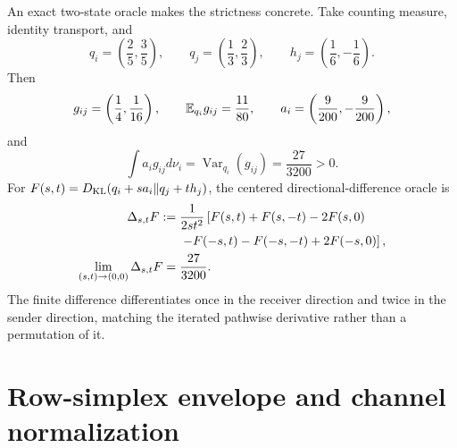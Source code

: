 An exact two-state oracle makes the strictness concrete. Take counting measure, identity transport, and
\begin{equation}
q_i=\left(\frac25,\frac35\right),
\qquad
q_j=\left(\frac13,\frac23\right),
\qquad
h_j=\left(\frac16,-\frac16\right).
\label{eq:appendix-moving-peer-discrete-data}
\end{equation}
Then
\begin{equation}
g_{ij}=\left(\frac14,\frac1{16}\right),
\qquad
\mathbb E_{q_i}g_{ij}=\frac{11}{80},
\qquad
a_i=\left(\frac9{200},-\frac9{200}\right),
\label{eq:appendix-moving-peer-discrete-tangent}
\end{equation}
and
\begin{equation}
\int a_i g_{ij}d\nu_i
=\operatorname{Var}_{q_i}(g_{ij})
=\frac{27}{3200}>0.
\label{eq:appendix-moving-peer-discrete-variance}
\end{equation}
For \(F(s,t)=D_{\mathrm{KL}}(q_i+s a_i\Vert q_j+t h_j)\), the centered directional-difference oracle is
\begin{align}
\Delta_{s,t}F
:={}&\frac{1}{2st^2}\left[
F(s,t)+F(s,-t)-2F(s,0)
\right.\notag\\
&\left.-F(-s,t)-F(-s,-t)+2F(-s,0)
\right],
\label{eq:appendix-moving-peer-finite-difference}\\
\lim_{(s,t)\to(0,0)}\Delta_{s,t}F
={}&\frac{27}{3200}.
\label{eq:appendix-moving-peer-finite-difference-limit}
\end{align}
The finite difference differentiates once in the receiver direction and twice in the sender direction, matching the iterated pathwise derivative rather than a permutation of it.

\section{Row-simplex envelope and channel normalization}
\label{sec:pifb2-row-envelope-proof}

